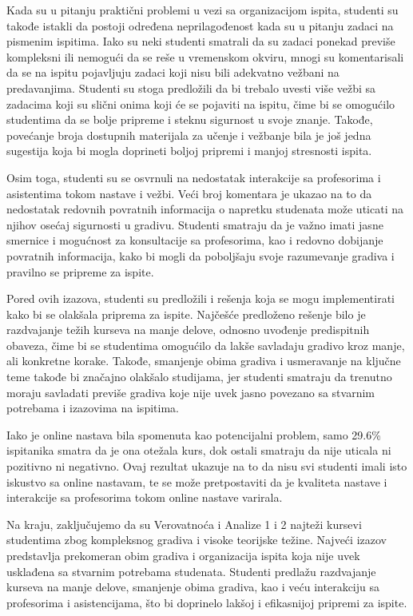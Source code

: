 \documentclass[a4paper]{article}
\begin{document}
Kada su u pitanju praktični problemi u vezi sa organizacijom ispita, studenti su takođe istakli da postoji određena neprilagođenost kada su u pitanju zadaci na pismenim ispitima. Iako su neki studenti smatrali da su zadaci ponekad previše kompleksni ili nemogući da se reše u vremenskom okviru, mnogi su komentarisali da se na ispitu pojavljuju zadaci koji nisu bili adekvatno vežbani na predavanjima. Studenti su stoga predložili da bi trebalo uvesti više vežbi sa zadacima koji su slični onima koji će se pojaviti na ispitu, čime bi se omogućilo studentima da se bolje pripreme i steknu sigurnost u svoje znanje. Takođe, povećanje broja dostupnih materijala za učenje i vežbanje bila je još jedna sugestija koja bi mogla doprineti boljoj pripremi i manjoj stresnosti ispita.

Osim toga, studenti su se osvrnuli na nedostatak interakcije sa profesorima i asistentima tokom nastave i vežbi. Veći broj komentara je ukazao na to da nedostatak redovnih povratnih informacija o napretku studenata može uticati na njihov osećaj sigurnosti u gradivu. Studenti smatraju da je važno imati jasne smernice i mogućnost za konsultacije sa profesorima, kao i redovno dobijanje povratnih informacija, kako bi mogli da poboljšaju svoje razumevanje gradiva i pravilno se pripreme za ispite.

Pored ovih izazova, studenti su predložili i rešenja koja se mogu implementirati kako bi se olakšala priprema za ispite. Najčešće predloženo rešenje bilo je razdvajanje težih kurseva na manje delove, odnosno uvođenje predispitnih obaveza, čime bi se studentima omogućilo da lakše savladaju gradivo kroz manje, ali konkretne korake. Takođe, smanjenje obima gradiva i usmeravanje na ključne teme takođe bi značajno olakšalo studijama, jer studenti smatraju da trenutno moraju savladati previše gradiva koje nije uvek jasno povezano sa stvarnim potrebama i izazovima na ispitima.

Iako je online nastava bila spomenuta kao potencijalni problem, samo 29.6\% ispitanika smatra da je ona otežala kurs, dok ostali smatraju da nije uticala ni pozitivno ni negativno. Ovaj rezultat ukazuje na to da nisu svi studenti imali isto iskustvo sa online nastavam, te se može pretpostaviti da je kvaliteta nastave i interakcije sa profesorima tokom online nastave varirala.

Na kraju, zaključujemo da su Verovatnoća i Analize 1 i 2 najteži kursevi studentima zbog kompleksnog gradiva i visoke teorijske težine. Najveći izazov predstavlja prekomeran obim gradiva i organizacija ispita koja nije uvek usklađena sa stvarnim potrebama studenata. Studenti predlažu razdvajanje kurseva na manje delove, smanjenje obima gradiva, kao i veću interakciju sa profesorima i asistencijama, što bi doprinelo lakšoj i efikasnijoj pripremi za ispite.
\end{document}
